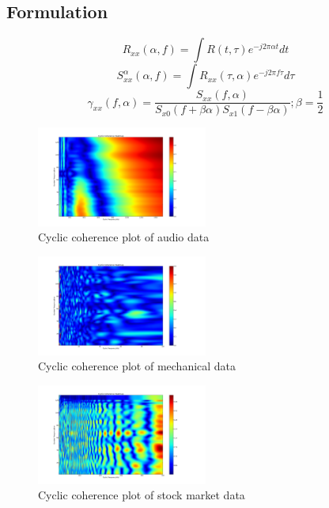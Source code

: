 \documentclass[journal]{IEEEtran}
\begin{document}
\subsection{Formulation}
\begin{equation}
    R_{xx}(\alpha,f) = \int R(t, \tau)e^{-j 2 \pi \alpha t}dt
\end{equation}
\begin{equation}
    S_{xx}^\alpha(\alpha,f) = \int R_{xx}(\tau,\alpha)e^{-j 2 \pi f \tau}d\tau 
\end{equation}
\begin{equation}
    \gamma_{xx}(f,\alpha) = \frac{S_{xx}(f,\alpha)}{S_{x0}(f+\beta \alpha)S_{x1}(f-\beta \alpha)}; \beta = \frac{1}{2}
\end{equation}

\begin{figure}[h!]
\centering
  \includegraphics[width=0.5\textwidth]{wav_2d_plot.png}
\caption{Cyclic coherence plot of audio data}
\label{fig:WAVCoherence}
\end{figure}

\begin{figure}[h!]
\centering
  \includegraphics[width=0.5\textwidth]{matfile_2d_plot.png}
\caption{Cyclic coherence plot of mechanical data}
\label{fig:MatCoherence}
\end{figure}

\begin{figure}[h!]
\centering
  \includegraphics[width=0.5\textwidth]{stock_2d_plot_near.png}
\caption{Cyclic coherence plot of stock market data}
\label{fig:StockCoherence}
\end{figure}
\end{document}
